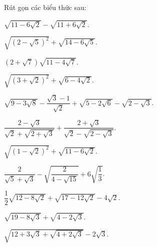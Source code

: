 \begin{bt}
	Rút gọn các biểu thức sau:
	\begin{listEX}[2]
	\item $\sqrt{11-6\sqrt{2}}-\sqrt{11+6\sqrt{2}} $.
	\item $\sqrt{(2-\sqrt{5})^2}+\sqrt{14-6\sqrt{5}} $.
	\item $(2+\sqrt{7})\sqrt{11-4\sqrt{7}} $.
	\item $\sqrt{(3+\sqrt{2})^2}+\sqrt{6-4\sqrt{2}} $.
	\item $\sqrt{9-3\sqrt{8}}-\dfrac{\sqrt{3}-1}{\sqrt{2}}+\sqrt{5-2\sqrt{6}}-\sqrt{2-\sqrt{3}}$.
	\item $\dfrac{2-\sqrt{3}}{\sqrt{2}+\sqrt{2+\sqrt{3}}}+\dfrac{2+\sqrt{3}}{\sqrt{2}-\sqrt{2-\sqrt{3}}}$.
	\item $\sqrt{\left(1-\sqrt{2}\right)^2}+\sqrt{11-6\sqrt{2}}$.
	\item $\dfrac{2}{\sqrt{5}+\sqrt{3}}-\sqrt{\dfrac{2}{4-\sqrt{15}}}+6\sqrt{\dfrac{1}{3}}$.
	\item $\dfrac{1}{2}\sqrt{12-8\sqrt{2}}+\sqrt{17-12\sqrt{2}}-4\sqrt{2}$.
	\item $\sqrt{19-8\sqrt{3}}+\sqrt{4-2\sqrt{3}}$.
	\item $\sqrt{12+3\sqrt{3}+\sqrt{4+2\sqrt{3}}}-2\sqrt{3}$.
	\end{listEX}
\end{bt}
